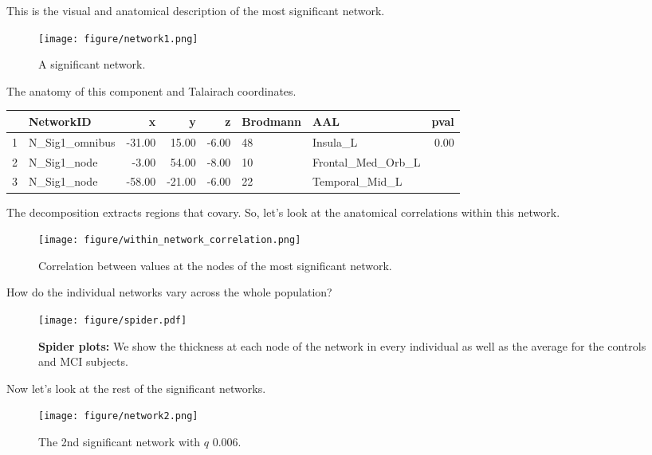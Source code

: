 \documentclass{elsarticle}\usepackage{graphicx, color}
\begin{document}
This is the visual and anatomical description of the most significant network.


\begin{figure}[h]
  \centering
    \texttt{[image: figure/network1.png]}
  \caption{A significant network.}
\end{figure}

The anatomy of this component and Talairach coordinates.
\begin{table}[ht]
\centering
\begin{tabular}{rlrrrllr}
  \hline
 & NetworkID & x & y & z & Brodmann & AAL & pval \\ 
  \hline
1 & N\_Sig1\_omnibus & -31.00 & 15.00 & -6.00 & 48 & Insula\_L & 0.00 \\ 
  2 & N\_Sig1\_node & -3.00 & 54.00 & -8.00 & 10 & Frontal\_Med\_Orb\_L &  \\ 
  3 & N\_Sig1\_node & -58.00 & -21.00 & -6.00 & 22 & Temporal\_Mid\_L &  \\ 
   \hline
\end{tabular}
\end{table}



The decomposition extracts regions that covary.  So, let's look at the anatomical correlations within this network.  



\begin{figure}[h]
  \centering
    \texttt{[image: figure/within\_network\_correlation.png]}
  \caption{Correlation between values at the nodes of the most significant network.}
\end{figure}


How do the individual networks vary across the whole population?



\begin{figure}[h]
  \centering
    \texttt{[image: figure/spider.pdf]}
  \caption{{\bf Spider plots:} We show the thickness at each node of the network in every individual as well as the average for the controls and MCI subjects.}
\end{figure}



Now let's look at the rest of the significant networks.


 
 \begin{figure}[h]
  \centering
    \texttt{[image: figure/network2.png]}
  \caption{The 2nd significant network with $q$ 0.006.}
\end{figure}
\end{document}
